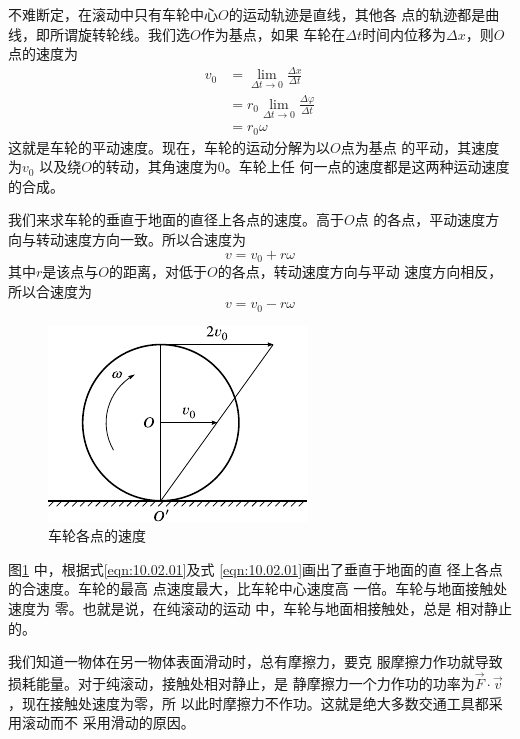\clearpage\noindent
不难断定，在滚动中只有车轮中心$ O $的运动轨迹是直线，其他各
点的轨迹都是曲线，即所谓旋转轮线。我们选$ O $作为基点，如果
车轮在$ \Delta t $时间内位移为$ \Delta x $，则$ O $点的速度为
\begin{equation*}
    \begin{split}
        v _ { 0 } &= \lim_{ \Delta t \to 0 } \frac { \Delta x } { \Delta t} \\
        &= r_ { 0 } \lim_{ \Delta t \to 0 } \frac { \Delta \varphi } { \Delta t }  \\
        &= r _ { 0 } \omega
    \end{split}
\end{equation*}
这就是车轮的平动速度。现在，车轮的运动分解为以$ O $点为基点
的平动，其速度为$  v _ { 0 }  $ 以及绕$ O $的转动，其角速度为$ 0 $。车轮上任
何一点的速度都是这两种运动速度的合成。

我们来求车轮的垂直于地面的直径上各点的速度。高于$ O $点
的各点，平动速度方向与转动速度方向一致。所以合速度为
\begin{equation}\label{eqn:10.02.01}
    v = v _ { 0 } + r \omega
\end{equation}
其中$ r $是该点与$ O $的距离，对低于$ O $的各点，转动速度方向与平动
速度方向相反，所以合速度为
\begin{equation}\label{eqn:10.02.02}
    v = v _ { 0 } - r \omega
\end{equation}
\begin{figure}
    \vspace{-0.8em}
    \centering
    \includegraphics{figure/fig10.10}
    \caption{车轮各点的速度}
    \label{fig:10.10}
\end{figure}
图\ref{fig:10.10} 中，根据式\eqref{eqn:10.02.01}及式
\eqref{eqn:10.02.01}画出了垂直于地面的直
径上各点的合速度。车轮的最高
点速度最大，比车轮中心速度高
一倍。车轮与地面接触处速度为
零。也就是说，在纯滚动的运动
中，车轮与地面相接触处，总是
相对静止的。

我们知道一物体在另一物体表面滑动时，总有摩擦力，要克
服摩擦力作功就导致损耗能量。对于纯滚动，接触处相对静止，是
静摩擦力一个力作功的功率为$ \vec{F} \cdot \vec{v} $，现在接触处速度为零，所
以此时摩擦力不作功。这就是绝大多数交通工具都采用滚动而不
采用滑动的原因。

